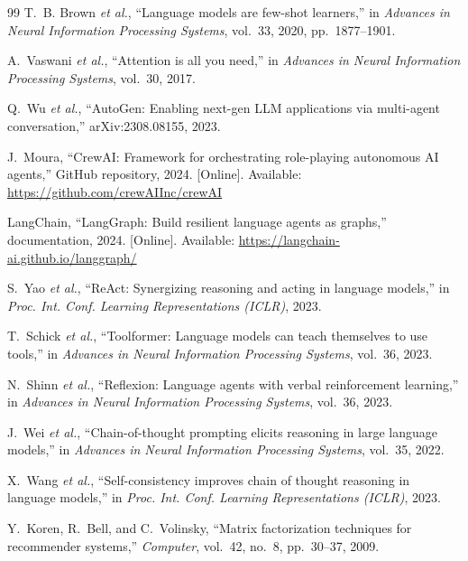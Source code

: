 \documentclass[journal]{IEEEtran}
\begin{document}
\begin{thebibliography}{99}
T.~B. Brown \emph{et al.}, ``Language models are few-shot learners,'' in
\emph{Advances in Neural Information Processing Systems}, vol.~33, 2020,
pp.~1877--1901.

A.~Vaswani \emph{et al.}, ``Attention is all you need,'' in \emph{Advances in
Neural Information Processing Systems}, vol.~30, 2017.

Q.~Wu \emph{et al.}, ``AutoGen: Enabling next-gen LLM applications via
multi-agent conversation,'' arXiv:2308.08155, 2023.

J.~Moura, ``CrewAI: Framework for orchestrating role-playing autonomous AI
agents,'' GitHub repository, 2024. [Online]. Available:
\url{https://github.com/crewAIInc/crewAI}

LangChain, ``LangGraph: Build resilient language agents as graphs,''
documentation, 2024. [Online]. Available:
\url{https://langchain-ai.github.io/langgraph/}

S.~Yao \emph{et al.}, ``ReAct: Synergizing reasoning and acting in language
models,'' in \emph{Proc. Int. Conf. Learning Representations (ICLR)}, 2023.

T.~Schick \emph{et al.}, ``Toolformer: Language models can teach themselves to
use tools,'' in \emph{Advances in Neural Information Processing Systems},
vol.~36, 2023.

N.~Shinn \emph{et al.}, ``Reflexion: Language agents with verbal reinforcement
learning,'' in \emph{Advances in Neural Information Processing Systems},
vol.~36, 2023.

J.~Wei \emph{et al.}, ``Chain-of-thought prompting elicits reasoning in large
language models,'' in \emph{Advances in Neural Information Processing Systems},
vol.~35, 2022.

X.~Wang \emph{et al.}, ``Self-consistency improves chain of thought reasoning
in language models,'' in \emph{Proc. Int. Conf. Learning Representations
(ICLR)}, 2023.

Y.~Koren, R.~Bell, and C.~Volinsky, ``Matrix factorization techniques for
recommender systems,'' \emph{Computer}, vol.~42, no.~8, pp.~30--37, 2009.


\end{thebibliography}
\end{document}
